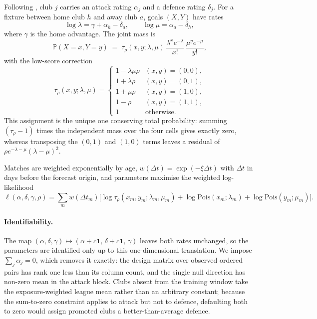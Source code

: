 \documentclass[11pt]{article}
\newcommand{\Prob}{\mathbb{P}}
\begin{document}
Following \citet{dixoncoles1997}, club $j$ carries an attack rating $\alpha_j$
and a defence rating $\delta_j$. For a fixture between home club $h$ and away
club $a$, goals $(X, Y)$ have rates
\begin{equation}
\log \lambda = \gamma + \alpha_h - \delta_a,
\qquad
\log \mu = \alpha_a - \delta_h ,
\end{equation}
where $\gamma$ is the home advantage. The joint mass is
\begin{equation}
\Prob(X = x, Y = y) \;=\; \tau_{\rho}(x, y; \lambda, \mu)\,
\frac{\lambda^{x} e^{-\lambda}}{x!}\,\frac{\mu^{y} e^{-\mu}}{y!} ,
\end{equation}
with the low-score correction
\begin{equation}
\tau_{\rho}(x,y;\lambda,\mu) =
\begin{cases}
1 - \lambda\mu\rho & (x,y) = (0,0),\\
1 + \lambda\rho    & (x,y) = (0,1),\\
1 + \mu\rho        & (x,y) = (1,0),\\
1 - \rho           & (x,y) = (1,1),\\
1                  & \text{otherwise.}
\end{cases}
\end{equation}
This assignment is the unique one conserving total probability: summing
$(\tau_\rho - 1)$ times the independent mass over the four cells gives exactly
zero, whereas transposing the $(0,1)$ and $(1,0)$ terms leaves a residual of
$\rho e^{-\lambda-\mu}(\lambda-\mu)^2$.

Matches are weighted exponentially by age, $w(\Delta t) = \exp(-\xi \Delta t)$
with $\Delta t$ in days before the forecast origin, and parameters maximise the
weighted log-likelihood
\begin{equation}
\ell(\alpha, \delta, \gamma, \rho) = \sum_{m} w(\Delta t_m)
\Big[ \log \tau_\rho(x_m, y_m; \lambda_m, \mu_m)
      + \log \mathrm{Pois}(x_m; \lambda_m)
      + \log \mathrm{Pois}(y_m; \mu_m) \Big].
\end{equation}

\paragraph{Identifiability.} The map $(\alpha, \delta, \gamma) \mapsto
(\alpha + c\mathbf{1},\, \delta + c\mathbf{1},\, \gamma)$ leaves both rates
unchanged, so the parameters are identified only up to this one-dimensional
translation. We impose $\sum_j \alpha_j = 0$, which removes it exactly: the
design matrix over observed ordered pairs has rank one less than its column
count, and the single null direction has non-zero mean in the attack block.
Clubs absent from the training window take the exposure-weighted league mean
rather than an arbitrary constant; because the sum-to-zero constraint applies
to attack but not to defence, defaulting both to zero would assign promoted
clubs a better-than-average defence.
\end{document}
